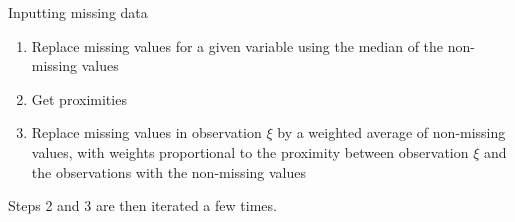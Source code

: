 \documentclass[11pt,compress,t,notes=noshow, xcolor=table]{beamer}
\begin{document}
\begin{frame}{Inputting missing data}
\begin{center}
\end{center}
\begin{enumerate}
\item Replace missing values for a given variable using the median of the non-missing values
\item Get proximities
\item Replace missing values in observation $\xi$ by a weighted average of non-missing values, with weights proportional to the proximity between observation $\xi$ and the observations with the non-missing values
\end{enumerate}
Steps 2 and 3 are then iterated a few times. %
\end{frame}

\endlecture
\end{document}

